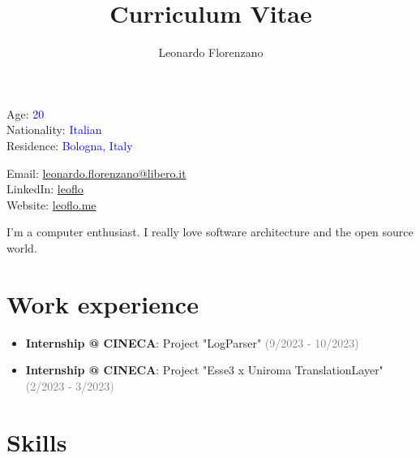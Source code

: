 \documentclass{paper}
\title{Curriculum Vitae}
\author{Leonardo Florenzano}
\begin{document}
\maketitle

\begin{multicols}{2}

\noindent
Age: \textcolor{blue}{20}\\
Nationality: \textcolor{blue}{Italian}\\
Residence: \textcolor{blue}{Bologna, Italy}

\columnbreak

\noindent
Email: \href{mailto:leonardo.florenzano@libero.it}{leonardo.florenzano@libero.it}\\
LinkedIn: \href{https://www.linkedin.com/in/leoflo}{leoflo}\\
Website: \href{https://leoflo.me}{leoflo.me}

\end{multicols}

\noindent
I'm a computer enthusiast. I really love software architecture and the open source world.

\section{Work experience}

\begin{itemize}
    \item \textbf{Internship @ CINECA}: Project "LogParser" \textcolor{gray}{(9/2023 - 10/2023)}
    \item \textbf{Internship @ CINECA}: Project "Esse3 x Uniroma TranslationLayer" \textcolor{gray}{(2/2023 - 3/2023)}
\end{itemize}

\section{Skills}
\end{document}
